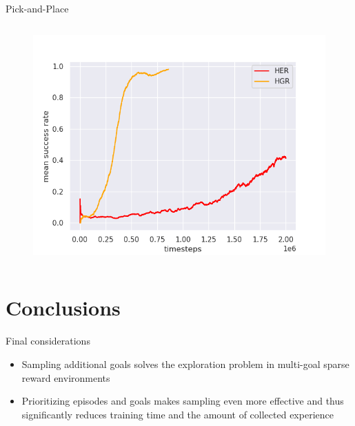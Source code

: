 \documentclass{beamer}
\begin{document}
      \begin{frame}{Pick-and-Place}
            \begin{columns}
                        \centering
                  \begin{figure}
                        \centering
                        \includegraphics[width=\columnwidth]{figures/pickandplace.png}
                  \end{figure}
            \end{columns}
      \end{frame}

\section{Conclusions}
      \begin{frame}{Final considerations}
            \begin{itemize}
                  \item Sampling additional goals solves the exploration problem in multi-goal sparse reward environments
                  \item Prioritizing episodes and goals makes sampling even more effective and thus significantly reduces training time and the amount of collected experience
            \end{itemize}
      \end{frame}
\end{document}
